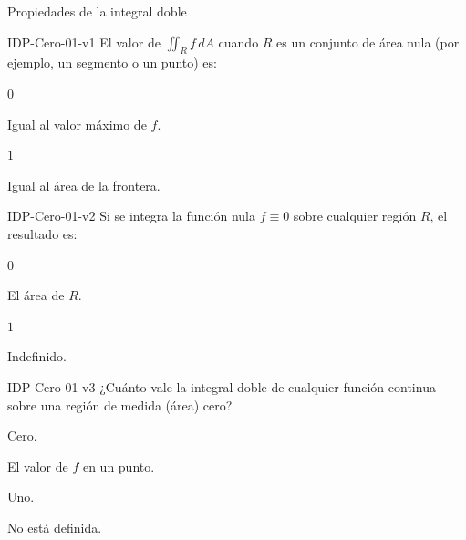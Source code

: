 \documentclass[a4,11pt]{aleph-notas}
\begin{document}
\begin{quiz}{Propiedades de la integral doble}
\begin{multi}[]%
    {IDP-Cero-01-v1}
    El valor de $\displaystyle\iint_R f\,dA$ cuando $R$ es un conjunto de área nula (por ejemplo, un segmento o un punto) es:
    \item* $0$
    \item Igual al valor máximo de $f$.
    \item $1$
    \item Igual al área de la frontera.
\end{multi}

\begin{multi}[]%
    {IDP-Cero-01-v2}
    Si se integra la función nula $f\equiv 0$ sobre cualquier región $R$, el resultado es:
    \item* $0$
    \item El área de $R$.
    \item $1$
    \item Indefinido.
\end{multi}

\begin{multi}[]%
    {IDP-Cero-01-v3}
    ¿Cuánto vale la integral doble de cualquier función continua sobre una región de medida (área) cero?
    \item* Cero.
    \item El valor de $f$ en un punto.
    \item Uno.
    \item No está definida.
\end{multi}

\end{quiz}
\end{document}

